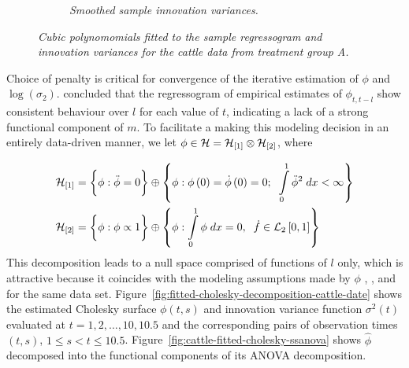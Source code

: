 \begin{figure}[H]
\begin{subfigure}{.48\textwidth}
 \caption{\textit{Smoothed sample innovation variances.} }
\label{fig:cattleA-innovariogram-cubic-smooth}
 \end{subfigure}
 \caption{\textit{Cubic polynomomials fitted to the sample regressogram and innovation variances for the cattle data from treatment group A.}} \label{fig:cattleA-smoothed-regressogram-variogram}
\end{figure}

Choice of penalty is critical for convergence of the iterative estimation of $\phi$ and $\log\left(\sigma_2 \right)$. \cite{pan2017jmcm} concluded that the regressogram of empirical estimates of $\phi_{t,t-l}$ show consistent behaviour over $l$ for each value of $t$, indicating a lack of a strong functional component of $m$. To facilitate a making this modeling decision in an entirely data-driven manner, we let $\phi \in \mathcal{H} = \mathcal{H}_{\left[1\right]} \otimes \mathcal{H}_{\left[2\right]}$, where 

\begin{align*} 
\mathcal{H}_{\left[1\right]} &= \bigg\{ \phi: \ddot{\phi} = 0 \bigg\} \oplus \left\{\phi: \phi\left(0\right) = \dot{\phi}\left(0\right) = 0; \;\; \int\limits_0^1 \ddot{\phi}^2 \;dx < \infty \right\} \\
\mathcal{H}_{\left[2\right]} &= \bigg\{ \phi: \phi \propto 1 \bigg\} \oplus \left\{ \phi: \int\limits_0^1 \phi \;dx = 0, \;\; \dot{f} \in \mathcal{L}_2\left[0,1\right]  \right\} 
\end{align*} 
\noindent
This decomposition leads to a null space comprised of functions of $l$ only, which is attractive because it coincides with the modeling assumptions made by $\phi$ \cite{pan2017jmcm}, \cite{huang2006covariance}, and \cite{wu2003nonparametric} for the same data set.  Figure~\ref{fig:fitted-cholesky-decomposition-cattle-date} shows the estimated Cholesky surface $\phi\left( t,s\right)$ and innovation variance function $\sigma^2\left(t\right)$ evaluated at $t = 1, 2, \dots, 10, 10.5$ and the corresponding pairs of observation times $\left(t,s\right)$, $1 \le s < t \le 10.5$. Figure~\ref{fig:cattle-fitted-cholesky-ssanova} shows $\hat{\phi}$ decomposed into the functional components of its ANOVA decomposition.

